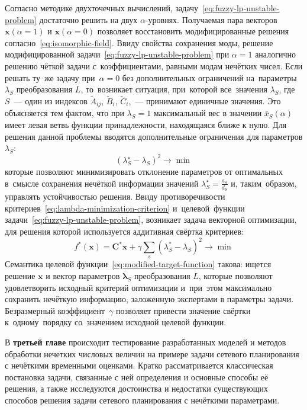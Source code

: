 Согласно методике двухточечных вычислений, задачу~\eqref{eq:fuzzy-lp-unstable-problem} достаточно решить на двух $\alpha$-уровнях. Получаемая пара векторов $\mathbf{x}\left( \alpha =1 \right)$ и $\mathbf{x}\left( \alpha =0 \right)$ позволяет восстановить модифицированные решения согласно~\eqref{eq:isomorphic-field}. Ввиду свойства сохранения моды, решение модифицированной задачи~\eqref{eq:fuzzy-lp-unstable-problem} при $\alpha=1$ аналогично решению чёткой задачи с~коэффициентами, равными модам нечётких чисел. Если решать ту~же задачу при~$\alpha=0$ без дополнительных ограничений на~параметры $\lambda_S$ преобразования $L$, то~возникает ситуация, при~которой все~значения $\lambda_S$, где~$S$~--- один из индексов $\tilde A_{ij}$, $\tilde B_i$, $\tilde C_i$,~--- принимают единичные значения. Это объясняется тем фактом, что при $\lambda_S=1$ максимальный вес в значении $\bar{x}_S\left(\alpha \right)$ имеет левая ветвь функции принадлежности, находящаяся ближе к нулю. Для решения данной проблемы вводятся дополнительные ограничения для параметров $\lambda_S$:
\begin{equation}
\label{eq:lambda-minimization-criterion}
  {\left( \lambda_{S}^{\star}-\lambda_S \right)}^2\to \min
\end{equation}
которые позволяют минимизировать отклонение параметров от оптимальных в~смысле сохранения нечёткой информации значений $\displaystyle \lambda_{S}^{\star}=\frac{a_S}{d_S}$ и, таким~образом, управлять устойчивостью решения. Ввиду противоречивости критериев~\eqref{eq:lambda-minimization-criterion} и~целевой~функции задачи~\eqref{eq:fuzzy-lp-unstable-problem}, возникает задача векторной оптимизации, для решения которой используется аддитивная свёртка критериев:
\begin{equation}
\label{eq:modified-target-function}
  f^{*}\left( \mathbf{x} \right)=\mathbf{C}^{*}\mathbf{x}+\gamma \sum\limits_{s}^{}{\left(\lambda_{S}^{*}-\lambda_S \right)}^{2} \to \min
\end{equation}
Семантика целевой функции~\eqref{eq:modified-target-function} такова: ищется решение $\mathbf{x}$ и вектор параметров $\mathbf{\lambda}_S$ преобразования $L$, которые позволяют удовлетворить исходный критерий оптимизации и~при~этом максимально сохранить нечёткую информацию, заложенную экспертами в параметры задачи. Безразмерный коэффициент~$\gamma$ позволяет привести значение свёртки к~одному~порядку со~значением исходной целевой функции.

В \textbf{третьей главе} происходит тестирование разработанных моделей и методов обработки нечетких числовых величин на примере задачи сетевого планирования с нечёткими временными оценками. Кратко рассматривается классическая постановка задачи, связанные с ней определения и основные способы её решения, а также исследуются достоинства и недостатки существующих способов решения задачи сетевого планирования с нечёткими параметрами.

